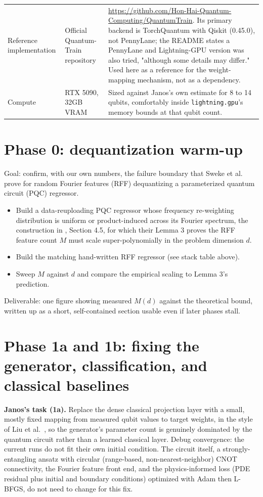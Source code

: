 \documentclass[10pt,a4paper]{article}
\begin{document}
\begin{center}
\begin{tabular}{@{}p{}p{}p{}@{}}
Reference implementation & Official Quantum-Train repository & \url{https://github.com/Hon-Hai-Quantum-Computing/QuantumTrain}. Its primary backend is TorchQuantum with Qiskit (0.45.0), not PennyLane; the README states a PennyLane and Lightning-GPU version was also tried, "although some details may differ." Used here as a reference for the weight-mapping mechanism, not as a dependency. \\
Compute & RTX 5090, 32GB VRAM & Sized against Janos's own estimate for 8 to 14 qubits, comfortably inside \texttt{lightning.gpu}'s memory bounds at that qubit count. \\
\end{tabular}
\end{center}

\section{Phase 0: dequantization warm-up}

Goal: confirm, with our own numbers, the failure boundary that Sweke et al.\ \cite{sweke2025} prove for random Fourier features (RFF) dequantizing a parameterized quantum circuit (PQC) regressor.

\begin{itemize}
\item Build a data-reuploading PQC regressor whose frequency re-weighting distribution is uniform or product-induced across its Fourier spectrum, the construction in \cite{sweke2025}, Section 4.5, for which their Lemma 3 proves the RFF feature count $M$ must scale super-polynomially in the problem dimension $d$.
\item Build the matching hand-written RFF regressor (see stack table above).
\item Sweep $M$ against $d$ and compare the empirical scaling to Lemma 3's prediction.
\end{itemize}

Deliverable: one figure showing measured $M(d)$ against the theoretical bound, written up as a short, self-contained section usable even if later phases stall.

\section{Phase 1a and 1b: fixing the generator, classification, and classical baselines}

\textbf{Janos's task (1a).} Replace the dense classical projection layer with a small, mostly fixed mapping from measured qubit values to target weights, in the style of Liu et al.\ \cite{liu2024}, so the generator's parameter count is genuinely dominated by the quantum circuit rather than a learned classical layer. Debug convergence: the current runs do not fit their own initial condition. The circuit itself, a strongly-entangling ansatz with circular (range-based, non-nearest-neighbor) CNOT connectivity, the Fourier feature front end, and the physics-informed loss (PDE residual plus initial and boundary conditions) optimized with Adam then L-BFGS, do not need to change for this fix.
\end{document}
